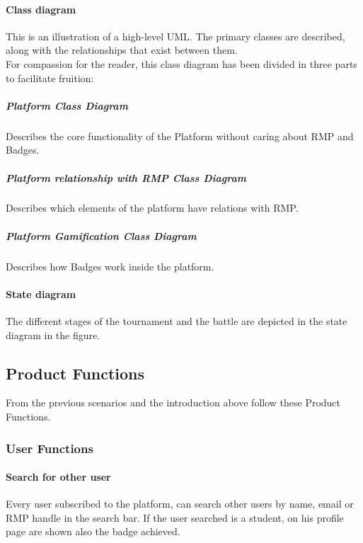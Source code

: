 \paragraph{Class diagram}
This is an illustration of a high-level UML. The primary classes are described, along with the relationships that exist between them.
\\For compassion for the reader, this class diagram has been divided in three parts to facilitate fruition:
\newpage
\subparagraph{Platform Class Diagram}
Describes the core functionality of the Platform without caring about RMP and Badges.\\
\newpage
\subparagraph{Platform relationship with RMP Class Diagram}
Describes which elements of the platform have relations with RMP.\\
\subparagraph{Platform Gamification Class Diagram}
Describes how Badges work inside the platform.\\
\newpage 

\paragraph{State diagram}
The different stages of the tournament and the battle are depicted in the state diagram in the figure.

\newpage

\subsection{Product Functions}
From the previous scenarios and the introduction above follow these Product Functions.

\subsubsection{User Functions}

\paragraph{Search for other user}
Every user subscribed to the platform, can search other users by name, email or RMP handle in the search bar. If the user searched is a student, on his profile page are shown also the badge achieved.

